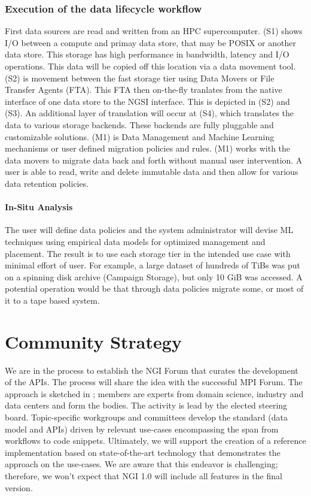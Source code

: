 \documentclass[a4paper, twocolumn]{article}
\begin{document}
\subsubsection{Execution of the data lifecycle workflow}
First data sources are read and written from an HPC supercomputer. (S1) shows I/O between a compute and primay data store, that may be POSIX or another data store. This storage has high performance in bandwidth, latency and I/O operations. This data will be copied off this location via a data movement tool. (S2) is movement between the fast storage tier using Data Movers or File Transfer Agents (FTA). This FTA then on-the-fly tranlates from the native interface of one data store to the NGSI interface. This is depicted in (S2) and (S3). An additional layer of translation will occur at (S4), which translates the data to various storage backends. These backends are fully pluggable and customizable solutions. (M1) is Data Management and Machine Learning mechanisms or user defined migration policies and rules. (M1) works with the data movers to migrate data back and forth without manual user intervention. A user is able to read, write and delete immutable data and then allow for various data retention policies.


\paragraph{In-Situ Analysis}
The user will define data policies and the system administrator will devise ML techniques using empirical data models for optimized management and placement. The result is to use each storage tier in the intended use case with minimal effort of user. For example, a large dataset of hundreds of TiBs was put on a spinning disk archive (Campaign Storage), but only 10 GiB was accessed. A potential operation would be that through data policies migrate some, or most of it to a tape based system.

\section{Community Strategy}
\label{sec:community}

We are in the process to establish the NGI Forum that curates the development of the APIs.
The process will share the idea with the successful MPI Forum.
The approach is sketched in ;
members are experts from domain science, industry and data centers and form the bodies.
The activity is lead by the elected steering board.
Topic-specific workgroups and committees develop the standard (data model and APIs) driven by relevant use-cases encompassing the span from workflows to code snippets.
Ultimately, we will support the creation of a reference implementation based on state-of-the-art technology that demonstrates the approach on the use-cases.
We are aware that this endeavor is challenging; therefore, we won't expect that NGI 1.0 will include all features in the final version.
\end{document}
